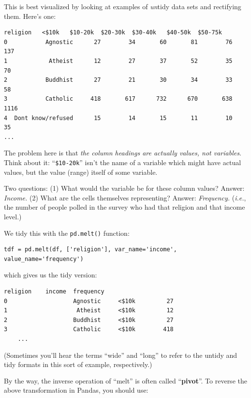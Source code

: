 \documentclass[12pt]{article}
\begin{document}
\vspace{.2in}
This is best visualized by looking at examples of \textit{un}tidy data sets
and rectifying them. Here's one:
\small
\begin{Verbatim}[fontsize=\small,samepage=true,frame=none]
            religion   <$10k   $10-20k  $20-30k  $30-40k   $40-50k  $50-75k
0           Agnostic      27        34       60       81        76      137
1            Atheist      12        27       37       52        35       70
2           Buddhist      27        21       30       34        33       58
3           Catholic     418       617      732      670       638     1116
4  Dont know/refused      15        14       15       11        10       35
...
\end{Verbatim}
\normalsize

The problem here is that \textit{the column headings are actually values, not
variables}. Think about it: ``\texttt{\$10-20k}'' isn't the name of a variable
which might have actual values, but the value (range) itself of some variable.

Two questions: (1) What would the variable be for these column values? Answer:
\textit{Income.} (2) What are the cells themselves representing? Answer:
\textit{Frequency.} (\textit{i.e.}, the number of people polled in the survey
who had that religion and that income level.)

We tidy this with the \texttt{pd.melt()} function:

\begin{Verbatim}[fontsize=\small,samepage=true,frame=none]
tdf = pd.melt(df, ['religion'], var_name='income', value_name='frequency')
\end{Verbatim}

which gives us the tidy version:
\begin{Verbatim}[fontsize=\small,samepage=true,frame=none]
                    religion    income  frequency
0                   Agnostic     <$10k         27
1                    Atheist     <$10k         12
2                   Buddhist     <$10k         27
3                   Catholic     <$10k        418
    ...
\end{Verbatim}
(Sometimes you'll hear the terms ``wide'' and ``long'' to refer to the untidy
and tidy formats in this sort of example, respectively.)

\vspace{.1in}
By the way, the inverse operation of ``melt'' is often called
``\textbf{pivot}''. To reverse the above transformation in Pandas, you should
use:
\end{document}
